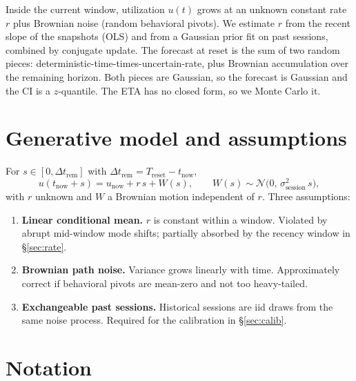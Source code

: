 \documentclass[11pt]{article}
\newcommand{\sigsessionsq}{\sigma_{\text{session}}^2}
\newcommand{\unow}{u_{\text{now}}}
\newcommand{\tnow}{t_{\text{now}}}
\newcommand{\Treset}{T_{\text{reset}}}
\newcommand{\Dtrem}{\Delta t_{\text{rem}}}
\begin{document}
Inside the current window, utilization $u(t)$ grows at an unknown constant
rate $r$ plus Brownian noise (random behavioral pivots). We estimate $r$ from
the recent slope of the snapshots (OLS) and from a Gaussian prior fit on
past sessions, combined by conjugate update. The forecast at reset is the
sum of two random pieces: deterministic-time-times-uncertain-rate, plus
Brownian accumulation over the remaining horizon. Both pieces are Gaussian,
so the forecast is Gaussian and the CI is a $z$-quantile. The ETA has no
closed form, so we Monte Carlo it.

\section{Generative model and assumptions}

For $s \in [0, \Dtrem]$ with $\Dtrem = \Treset - \tnow$,
\[
  u(\tnow + s) = \unow + r\,s + W(s),
  \qquad W(s) \sim \mathcal{N}\!\bigl(0,\, \sigsessionsq\,s\bigr),
\]
with $r$ unknown and $W$ a Brownian motion independent of $r$. Three
assumptions:

\begin{enumerate}
  \item \textbf{Linear conditional mean.} $r$ is constant within a window.
    Violated by abrupt mid-window mode shifts; partially absorbed by the
    recency window in \S\ref{sec:rate}.
  \item \textbf{Brownian path noise.} Variance grows linearly with time.
    Approximately correct if behavioral pivots are mean-zero and not too
    heavy-tailed.
  \item \textbf{Exchangeable past sessions.} Historical sessions are iid
    draws from the same noise process. Required for the calibration in
    \S\ref{sec:calib}.
\end{enumerate}

\section{Notation}
\end{document}
